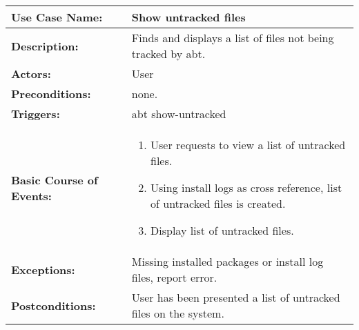 
\begin{tabularx}{\linewidth}{|l|X|}
\hline
\textbf{Use Case Name:} & \textbf{Show untracked files} \\
\hline
\textbf{Description:} & Finds and displays a list of files not being tracked by abt. \\
\hline
\textbf{Actors:} & User \\
\hline
\textbf{Preconditions:} & none. \\
\hline
\textbf{Triggers:} & abt show-untracked \\
\hline
\textbf{Basic Course of Events:} & 
\begin{minipage}{\linewidth} 
  \vspace{0.05em}
  \begin{enumerate}
    \item User requests to view a list of untracked files.
    \item Using install logs as cross reference, list of untracked files is created.
    \item Display list of untracked files.
  \end{enumerate}
  \vspace{0.05em}
\end{minipage}
\\
\hline 
\textbf{Exceptions:} & Missing installed packages or install log files, report error. \\
\hline 
\textbf{Postconditions:} &
User has been presented a list of untracked files on the system. \\
\hline
\end{tabularx}


